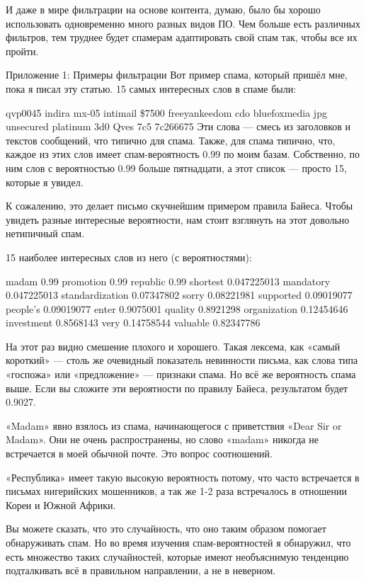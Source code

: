 \documentclass[ebook,12pt,oneside,openany]{memoir}
\begin{document}
И даже в мире фильтрации на основе контента, думаю, было бы хорошо
использовать одновременно много разных видов ПО. Чем больше есть
различных фильтров, тем труднее будет спамерам адаптировать свой спам
так, чтобы все их пройти.

Приложение 1: Примеры фильтрации Вот пример спама, который пришёл мне,
пока я писал эту статью. 15 самых интересных слов в спаме были:

qvp0045 indira mx-05 intimail \$7500 freeyankeedom cdo bluefoxmedia
jpg unsecured platinum 3d0 Qves 7c5 7c266675 Эти слова — смесь из
заголовков и текстов сообщений, что типично для спама. Также, для
спама типично, что, каждое из этих слов имеет спам-вероятность 0.99 по
моим базам. Собственно, по ним слов с вероятностью 0.99 больше
пятнадцати, а этот список — просто 15, которые я увидел.

К сожалению, это делает письмо скучнейшим примером правила Байеса.
Чтобы увидеть разные интересные вероятности, нам стоит взглянуть на
этот довольно нетипичный спам.

15 наиболее интересных слов из него (с вероятностями):

madam 0.99 promotion 0.99 republic 0.99 shortest 0.047225013 mandatory
0.047225013 standardization 0.07347802 sorry 0.08221981 supported
0.09019077 people’s 0.09019077 enter 0.9075001 quality 0.8921298
organization 0.12454646 investment 0.8568143 very 0.14758544 valuable
0.82347786


На этот раз видно смешение плохого и хорошего. Такая лексема, как
«самый короткий» — столь же очевидный показатель невинности письма,
как слова типа «госпожа» или «предложение» — признаки спама. Но всё же
вероятность спама выше. Если вы сложите эти вероятности по правилу
Байеса, результатом будет 0.9027.

«Madam» явно взялось из спама, начинающегося с приветствия «Dear Sir
or Madam». Они не очень распространены, но слово «madam» никогда не
встречается в моей обычной почте. Это вопрос соотношений.

«Республика» имеет такую высокую вероятность потому, что часто
встречается в письмах нигерийских мошенников, а так же 1-2 раза
встречалось в отношении Кореи и Южной Африки.

Вы можете сказать, что это случайность, что оно таким образом помогает
обнаруживать спам. Но во время изучения спам-вероятностей я обнаружил,
что есть множество таких случайностей, которые имеют необъяснимую
тенденцию подталкивать всё в правильном направлении, а не в неверном.
\end{document}
